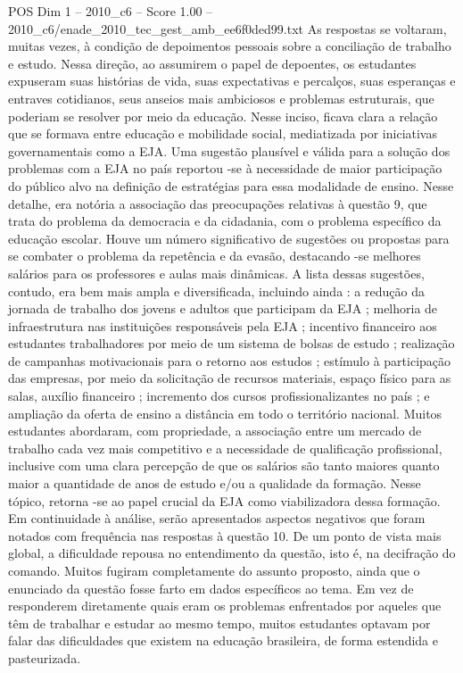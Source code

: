 \begin{textsample}{POS Dim 1 – 2010\_c6 – Score 1.00 – 2010\_c6/enade\_2010\_tec\_gest\_amb\_ee6f0ded99.txt}
As respostas se voltaram, muitas vezes, à condição de depoimentos pessoais sobre a conciliação de trabalho e estudo.
Nessa direção, ao assumirem o papel de depoentes, os estudantes expuseram suas histórias de vida, suas expectativas e percalços, suas esperanças e entraves cotidianos, seus anseios mais ambiciosos e problemas estruturais, que poderiam se resolver por meio da educação.
Nesse inciso, ficava clara a relação que se formava entre educação e mobilidade social, mediatizada por iniciativas governamentais como a EJA.
Uma sugestão plausível e válida para a solução dos problemas com a EJA no país reportou -se à necessidade de maior participação do público alvo na definição de estratégias para essa modalidade de ensino.
Nesse detalhe, era notória a associação das preocupações relativas à questão 9, que trata do problema da democracia e da cidadania, com o problema específico da educação escolar.
Houve um número significativo de sugestões ou propostas para se combater o problema da repetência e da evasão, destacando -se melhores salários para os professores e aulas mais dinâmicas.
A lista dessas sugestões, contudo, era bem mais ampla e diversificada, incluindo ainda : a redução da jornada de trabalho dos jovens e adultos que participam da EJA ; melhoria de infraestrutura nas instituições responsáveis pela EJA ; incentivo financeiro aos estudantes trabalhadores por meio de um sistema de bolsas de estudo ; realização de campanhas motivacionais para o retorno aos estudos ; estímulo à participação das empresas, por meio da solicitação de recursos materiais, espaço físico para as salas, auxílio financeiro ; incremento dos cursos profissionalizantes no país ; e ampliação da oferta de ensino a distância em todo o território nacional.
Muitos estudantes abordaram, com propriedade, a associação entre um mercado de trabalho cada vez mais competitivo e a necessidade de qualificação profissional, inclusive com uma clara percepção de que os salários são tanto maiores quanto maior a quantidade de anos de estudo e/ou a qualidade da formação.
Nesse tópico, retorna -se ao papel crucial da EJA como viabilizadora dessa formação.
Em continuidade à análise, serão apresentados aspectos negativos que foram notados com frequência nas respostas à questão 10.
De um ponto de vista mais global, a dificuldade repousa no entendimento da questão, isto é, na decifração do comando.
Muitos fugiram completamente do assunto proposto, ainda que o enunciado da questão fosse farto em dados específicos ao tema.
Em vez de responderem diretamente quais eram os problemas enfrentados por aqueles que têm de trabalhar e estudar ao mesmo tempo, muitos estudantes optavam por falar das dificuldades que existem na educação brasileira, de forma estendida e pasteurizada.

\end{textsample}
